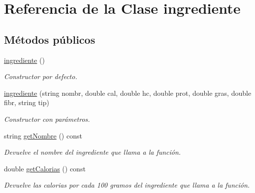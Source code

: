 \hypertarget{classingrediente}{}\section{Referencia de la Clase ingrediente}
\label{classingrediente}
\subsection*{Métodos públicos}
\begin{DoxyCompactItemize}
\item 
\mbox{\label{classingrediente_a4f2c8e16106eb4cf5a8ad9695d7a3809}} 
\hyperlink{classingrediente_a4f2c8e16106eb4cf5a8ad9695d7a3809}{ingrediente} ()
\begin{DoxyCompactList}\small\item\em Constructor por defecto. \end{DoxyCompactList}\item 
\hyperlink{classingrediente_aca95519106de3689d8b4eeb6278aa77d}{ingrediente} (string nombr, double cal, double hc, double prot, double gras, double fibr, string tip)
\begin{DoxyCompactList}\small\item\em Constructor con parámetros. \end{DoxyCompactList}\item 
\mbox{\label{classingrediente_a8da227d03af8811627434703922b463a}} 
string \hyperlink{classingrediente_a8da227d03af8811627434703922b463a}{get\+Nombre} () const
\begin{DoxyCompactList}\small\item\em Devuelve el nombre del ingrediente que llama a la función. \end{DoxyCompactList}\item 
\mbox{\label{classingrediente_ab61ade959dac30f2e025b806531d34cd}} 
double \hyperlink{classingrediente_ab61ade959dac30f2e025b806531d34cd}{get\+Calorias} () const
\begin{DoxyCompactList}\small\item\em Devuelve las calorias por cada 100 gramos del ingrediente que llama a la función. \end{DoxyCompactList}\item 
\mbox{\label{classingrediente_ae51c33e37001b7807a7b2d7bd7352355}} 

\end{DoxyCompactItemize}
